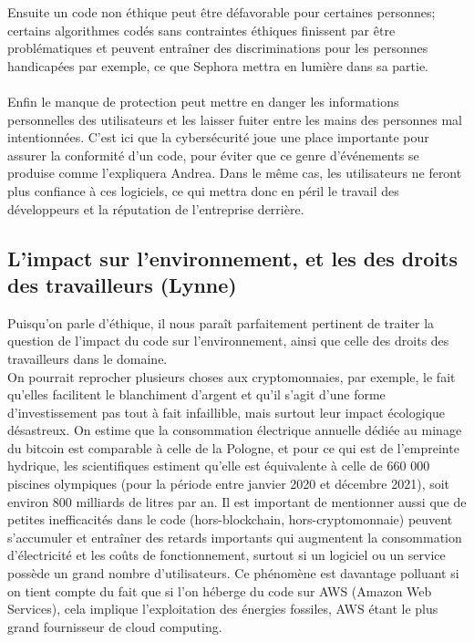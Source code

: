 \documentclass{article}
\begin{document}
Ensuite un code non éthique peut être défavorable pour certaines personnes; certains algorithmes codés sans contraintes éthiques finissent par être problématiques et peuvent entraîner des discriminations pour les personnes handicapées par exemple, ce que Sephora mettra en lumière dans sa partie.\\\\

Enfin le manque de protection peut mettre en danger les informations personnelles des utilisateurs et les laisser fuiter entre les mains des personnes mal intentionnées. C'est ici que la cybersécurité joue une place importante pour assurer la conformité d'un code, pour éviter que ce genre d'événements se produise comme l'expliquera Andrea. Dans le même cas, les utilisateurs ne feront plus confiance à ces logiciels, ce qui mettra donc en péril le travail des développeurs et la réputation de l'entreprise derrière.\\

\subsection{L'impact sur l'environnement, et les des droits des travailleurs (Lynne)} 
Puisqu’on parle d’éthique, il nous paraît parfaitement pertinent de traiter la question de l’impact du code sur l’environnement, ainsi que celle des droits des travailleurs dans le domaine.\\ 

On pourrait reprocher plusieurs choses aux cryptomonnaies, par exemple, le fait qu’elles facilitent le blanchiment d’argent et qu’il s’agit d’une forme d’investissement pas tout à fait infaillible, mais surtout leur impact écologique désastreux. On estime que la consommation électrique annuelle dédiée au minage du bitcoin est comparable à celle de la Pologne, et pour ce qui est de l’empreinte hydrique, les scientifiques estiment qu'elle est équivalente à celle de 660 000 piscines olympiques (pour la période entre janvier 2020 et décembre 2021), soit environ 800 milliards de litres par an. Il est important de mentionner aussi que de petites inefficacités dans le code (hors-blockchain, hors-cryptomonnaie) peuvent s’accumuler et entraîner des retards importants qui augmentent la consommation d'électricité et les coûts de fonctionnement, surtout si un logiciel ou un service possède un grand nombre d’utilisateurs. Ce phénomène est davantage polluant si on tient compte du fait que si l’on héberge du code sur AWS (Amazon Web Services), cela implique l’exploitation des énergies fossiles, AWS étant le plus grand fournisseur de cloud computing.\\
\end{document}
